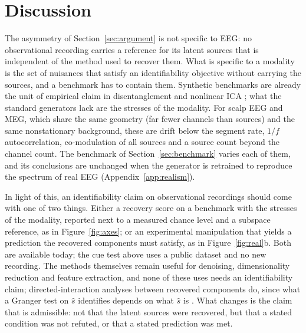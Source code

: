 \section{Discussion}
\label{sec:discussion}

The asymmetry of Section~\ref{sec:argument} is not specific to EEG: no observational recording carries a reference for its latent sources that is independent of the method used to recover them.
What is specific to a modality is the set of nuisances that satisfy an identifiability objective without carrying the sources, and a benchmark has to contain them.
Synthetic benchmarks are already the unit of empirical claim in disentanglement and nonlinear ICA \citep{locatello2019challenging,hyvarinen2016tcl,khemakhem2020ivae}; what the standard generators lack are the stresses of the modality.
For scalp EEG and MEG, which share the same geometry (far fewer channels than sources) and the same nonstationary background, these are drift below the segment rate, $1/f$ autocorrelation, co-modulation of all sources and a source count beyond the channel count.
The benchmark of Section~\ref{sec:benchmark} varies each of them, and its conclusions are unchanged when the generator is retrained to reproduce the spectrum of real EEG (Appendix~\ref{app:realism}).

In light of this, an identifiability claim on observational recordings should come with one of two things.
Either a recovery score on a benchmark with the stresses of the modality, reported next to a measured chance level and a subspace reference, as in Figure~\ref{fig:axes}; or an experimental manipulation that yields a prediction the recovered components must satisfy, as in Figure~\ref{fig:real}b.
Both are available today; the cue test above uses a public dataset and no new recording.
The methods themselves remain useful for denoising, dimensionality reduction and feature extraction, and none of these uses needs an identifiability claim; directed-interaction analyses between recovered components \citep{granger1969investigating,seth2015granger,nolte2008meg} do, since what a Granger test on $\hat{s}$ identifies depends on what $\hat{s}$ is \citep{stokes2017study}.
What changes is the claim that is admissible: not that the latent sources were recovered, but that a stated condition was not refuted, or that a stated prediction was met.

